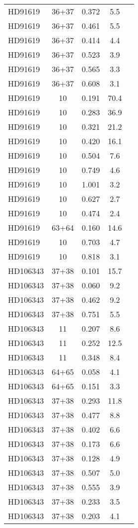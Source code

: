 \begin{table*}
\begin{tabular}{l c c c c}
HD91619 & 36+37 & 0.372 & 5.5\\ 
HD91619 & 36+37 & 0.461 & 5.5\\ 
HD91619 & 36+37 & 0.414 & 4.4\\ 
HD91619 & 36+37 & 0.523 & 3.9\\ 
HD91619 & 36+37 & 0.565 & 3.3\\ 
HD91619 & 36+37 & 0.608 & 3.1\\ 
HD91619 & 10 & 0.191 & 70.4\\ 
HD91619 & 10 & 0.283 & 36.9\\ 
HD91619 & 10 & 0.321 & 21.2\\ 
HD91619 & 10 & 0.420 & 16.1\\ 
HD91619 & 10 & 0.504 & 7.6\\ 
HD91619 & 10 & 0.749 & 4.6\\ 
HD91619 & 10 & 1.001 & 3.2\\ 
HD91619 & 10 & 0.627 & 2.7\\ 
HD91619 & 10 & 0.474 & 2.4\\ 
HD91619 & 63+64 & 0.160 & 14.6\\ 
HD91619 & 10 & 0.703 & 4.7\\ 
HD91619 & 10 & 0.818 & 3.1\\ 
\hline
HD106343 & 37+38 & 0.101 & 15.7\\ 
HD106343 & 37+38 & 0.060 & 9.2\\ 
HD106343 & 37+38 & 0.462 & 9.2\\ 
HD106343 & 37+38 & 0.751 & 5.5\\ 
HD106343 & 11 & 0.207 & 8.6\\ 
HD106343 & 11 & 0.252 & 12.5\\ 
HD106343 & 11 & 0.348 & 8.4\\ 
HD106343 & 64+65 & 0.058 & 4.1\\ 
HD106343 & 64+65 & 0.151 & 3.3\\ 
HD106343 & 37+38 & 0.293 & 11.8\\ 
HD106343 & 37+38 & 0.477 & 8.8\\ 
HD106343 & 37+38 & 0.402 & 6.6\\ 
HD106343 & 37+38 & 0.173 & 6.6\\ 
HD106343 & 37+38 & 0.128 & 4.9\\ 
HD106343 & 37+38 & 0.507 & 5.0\\ 
HD106343 & 37+38 & 0.555 & 3.9\\ 
HD106343 & 37+38 & 0.233 & 3.5\\ 
HD106343 & 37+38 & 0.203 & 4.1\\ 

\end{tabular}
\end{table*}
